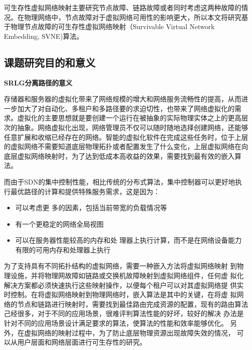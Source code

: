 可生存性虚拟网络映射主要研究节点故障、链路故障或者同时考虑这两种故障的情况。在物理网络中，节点故障对于虚拟网络可用性的影响更大，所以本文将研究基于物理节点故障的可生存性虚拟网络映射（Survivable Virtual Network Embedding, SVNE)算法。


\subsection{课题研究目的和意义}
\textbf{SRLG分离路径的意义}

存储器和服务器的虚拟化带来了网络规模的增大和网络服务流畅性的提高，从而进一步加大了对自动化、多租户和多路径要的求迫切性，也带来了网络虚拟化的需求。虚拟化的主要思想就是要创建一个运行在被抽象的实际物理实体之上的更高层次的抽象。网络虚拟化出现，网络管理员不仅可以随时随地选择创建网络，还能够任意扩展和收缩已经存在的网络。智能的虚拟化软件在完成这些任务时，位于上层的虚拟网络不需要知道底层物理拓扑或者配置发生了什么变化，上层虚拟网络在向底层虚拟网络映射时，为了达到低成本高收益的效果，需要找到最有效的嵌入算法。

而由于SDN的集中控制性能，相比传统的分布式算法，集中控制器可以更好地执行最优路径的计算和提供特殊服务需求，这是因为：
\begin{itemize}
  \item 可以考虑更 多的因素，包括当前带宽的负载情况等
  \item 有一个更稳定的网络全局视图
  \item 可以在服务器性能较高的内存和处 理器上执行计算，而不是在网络设备能力有限的可用内存和处理器上执行
\end{itemize}


为了支持具有不同拓扑结构的虚拟网络，需要一种嵌入方法将虚拟网络映射 到物理设施，并将物理网故障如链路或交换机故障映射到虚拟网络组件，任何虚 拟化解决方案都必须快速执行这些映射操作，以便每个租户可以对其虚拟网络提 供实时控制。在将虚拟网络映射到物理网络时，嵌入算法是其中的关键，在将虚 拟网络的节点和链路进行映射时，需要找到最佳路由完成资源的配置，现有的路由算法己经很多，对于不同的应用场景，很难评判算法性能的好坏，较好的解决 办法是针对不同的应用场景设计满足要求的算法，使算法的性能和效率能够优化。 另外，在虚拟网络的映射过程中，为了防止底层物理资源出现故障失效的情况， 可以从用户层面和网络层面进行可生存性的研究。


